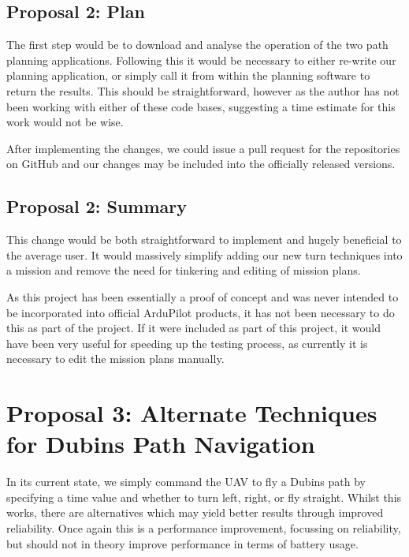 \subsection{Proposal 2: Plan} 
\label{future:proposal2:plan}
The first step would be to download and analyse the operation of the two path planning applications. Following this it would be necessary to either re-write our planning application, or simply call it from within the planning software to return the results. This should be straightforward, however as the author has not been working with either of these code bases, suggesting a time estimate for this work would not be wise. 

After implementing the changes, we could issue a pull request for the repositories on GitHub and our changes may be included into the officially released versions.

\subsection{Proposal 2: Summary}
\label{future:proposal2:summary}
This change would be both straightforward to implement and hugely beneficial to the average user. It would massively simplify adding our new turn techniques into a mission and remove the need for tinkering and editing of mission plans.

As this project has been essentially a proof of concept and was never intended to be incorporated into official ArduPilot products, it has not been necessary to do this as part of the project. If it were included as part of this project, it would have been very useful for speeding up the testing process, as currently it is necessary to edit the mission plans manually. 

\section{Proposal 3: Alternate Techniques for Dubins Path Navigation} 
\label{future:alternatedubins}
In its current state, we simply command the UAV to fly a Dubins path by specifying a time value and whether to turn left, right, or fly straight. Whilst this works, there are alternatives which may yield better results through improved reliability. Once again this is a performance improvement, focussing on reliability, but should not in theory improve performance in terms of battery usage.

